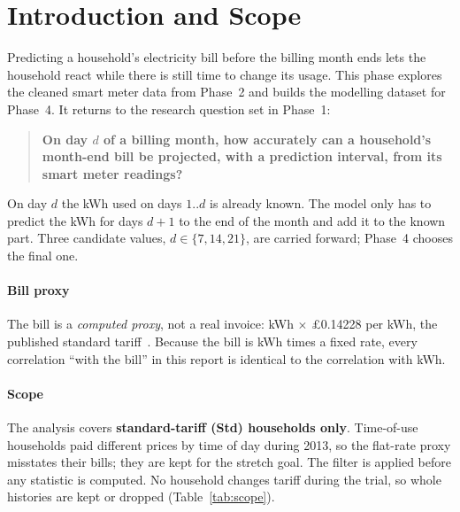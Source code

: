 \documentclass[11pt,letterpaper]{article}
\begin{document}
\maketitleblock

\section{Introduction and Scope}
\label{sec:intro}

Predicting a household's electricity bill before the billing month ends lets the household react while
there is still time to change its usage. This phase explores the cleaned smart meter data from Phase~2 and
builds the modelling dataset for Phase~4. It returns to the research question set in Phase~1:

\begin{quote}
\textbf{On day $d$ of a billing month, how accurately can a household's month-end bill be projected, with a
prediction interval, from its smart meter readings?}
\end{quote}

On day $d$ the kWh used on days $1..d$ is already known. The model only has to predict the kWh for days
$d{+}1$ to the end of the month and add it to the known part. Three candidate values, $d \in \{7, 14, 21\}$,
are carried forward; Phase~4 chooses the final one.

\paragraph{Bill proxy} The bill is a \emph{computed proxy}, not a real invoice: kWh $\times$ \pounds 0.14228
per kWh, the published standard tariff~\cite{datastore_smartmeters}. Because the bill is kWh times a fixed
rate, every correlation ``with the bill'' in this report is identical to the correlation with kWh.

\paragraph{Scope} The analysis covers \textbf{standard-tariff (Std) households only}. Time-of-use households
paid different prices by time of day during 2013, so the flat-rate proxy misstates their bills; they are kept
for the stretch goal. The filter is applied before any statistic is computed. No household changes tariff
during the trial, so whole histories are kept or dropped (Table~\ref{tab:scope}).
\end{document}
